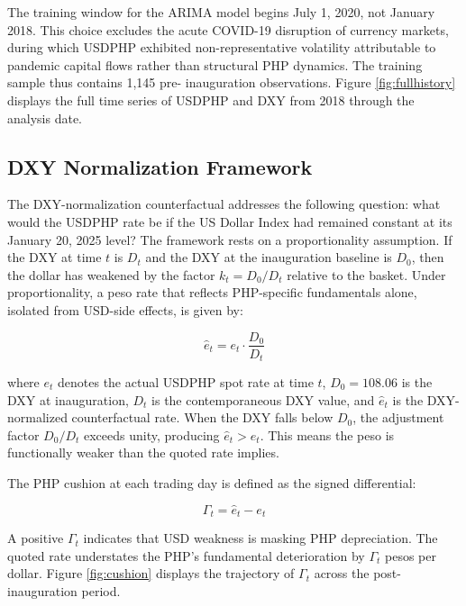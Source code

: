 \documentclass[12pt]{article}
\begin{document}
The training window for the ARIMA model begins July 1, 2020, not January 2018.
This choice excludes the acute COVID-19 disruption of currency markets, during which
USDPHP exhibited non-representative volatility attributable to pandemic capital flows
rather than structural PHP dynamics. The training sample thus contains 1,145 pre-
inauguration observations. Figure \ref{fig:fullhistory} displays the full time
series of USDPHP and DXY from 2018 through the analysis date.

\subsection{DXY Normalization Framework}

The DXY-normalization counterfactual addresses the following question: what would
the USDPHP rate be if the US Dollar Index had remained constant at its January 20,
2025 level? The framework rests on a proportionality assumption. If the DXY at time
$t$ is $D_t$ and the DXY at the inauguration baseline is $D_0$, then the dollar has
weakened by the factor $k_t = D_0 / D_t$ relative to the basket. Under
proportionality, a peso rate that reflects PHP-specific fundamentals alone, isolated
from USD-side effects, is given by:

\begin{equation}
  \hat{e}_t = e_t \cdot \frac{D_0}{D_t}
  \label{eq:normalization}
\end{equation}

where $e_t$ denotes the actual USDPHP spot rate at time $t$, $D_0 = 108.06$ is the
DXY at inauguration, $D_t$ is the contemporaneous DXY value, and $\hat{e}_t$ is the
DXY-normalized counterfactual rate. When the DXY falls below $D_0$, the adjustment
factor $D_0 / D_t$ exceeds unity, producing $\hat{e}_t > e_t$. This means the peso
is functionally weaker than the quoted rate implies.

The PHP cushion at each trading day is defined as the signed differential:

\begin{equation}
  \Gamma_t = \hat{e}_t - e_t
  \label{eq:cushion}
\end{equation}

A positive $\Gamma_t$ indicates that USD weakness is masking PHP depreciation. The
quoted rate understates the PHP's fundamental deterioration by $\Gamma_t$ pesos
per dollar. Figure \ref{fig:cushion} displays the trajectory of $\Gamma_t$ across
the post-inauguration period.
\end{document}
